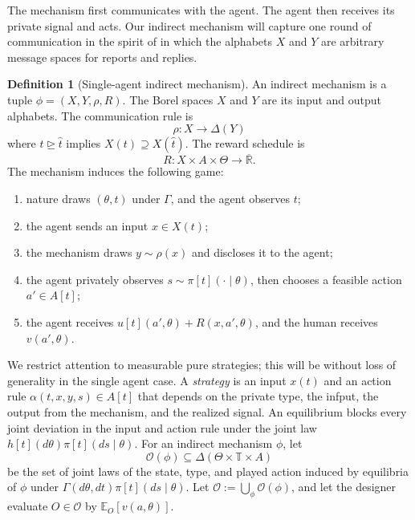 \documentclass[12pt,reqno]{article}
\newcommand{\Ex}{\mathbb{E}}
\newcommand{\Rbar}{\overline{\mathbb{R}}}
\theoremstyle{definition} \newtheorem{example}{Example}
\theoremstyle{definition} \newtheorem{condition}{Condition}
\theoremstyle{definition} \newtheorem{corollary}{Corollary}
\theoremstyle{definition} \newtheorem{claim}{Claim}
\theoremstyle{definition} \newtheorem{definition}{Definition}
\theoremstyle{definition} \newtheorem{conjecture}{Conjecture}
\theoremstyle{definition} \newtheorem{Lemma}{Lemma}
\theoremstyle{definition} \newtheorem{lemma}{Lemma}
\theoremstyle{plain} \newtheorem{theorem}{Theorem}
\theoremstyle{definition} \newtheorem{assumption}{Assumption}
\theoremstyle{definition} \newtheorem*{assumptionnonumber}{Assumption}
\theoremstyle{definition} \newtheorem*{theoremNoNumber}{Proposition}
\theoremstyle{definition}\newtheorem{proposition}{Proposition}
\theoremstyle{definition} \newtheorem{observation}{Observation}
\theoremstyle{definition} \newtheorem*{definitionNoNumber}{Definition}
\theoremstyle{definition} \newtheorem{Definition}{Definition}
\theoremstyle{definition} \newtheorem*{DefinitionNoNumber}{Definition}
\theoremstyle{definition} \newtheorem*{fact}{Fact}
\theoremstyle{definition} \newtheorem*{property}{Property}
\theoremstyle{definition} \newtheorem{remark}{Remark}
\theoremstyle{definition}\newtheorem{romanexampleinner}{Example}
\begin{document}
The mechanism first communicates with the agent. The agent then receives its private signal and acts. Our indirect mechanism will capture one round of communication in the spirit of \cite{myerson1982optimal,forges1986approach} in which the alphabets \(X\) and \(Y\) are arbitrary message spaces for reports and replies. 

\begin{definition}[Single-agent indirect mechanism]\label{def:mechanism-single}
An indirect mechanism is a tuple \(\phi=(X,Y,\rho,R)\). The Borel spaces \(X\) and \(Y\) are its input and output alphabets. The communication rule is 
\[
\rho:X\to\Delta(Y)
\]
where $t \trianglerighteq \hat t$ implies $X(t) \supseteq X(\hat t)$. The reward schedule is 
\[
R:X\times A\times\Theta\to\Rbar.
\]
The mechanism induces the following game:
\begin{enumerate}
    \item nature draws \((\theta,t)\) under \(\Gamma\), and the agent observes \(t\);
    \item the agent sends an input \(x\in {X(t)}\);
    \item the mechanism draws \(y\sim\rho(x)\) and discloses it to the agent;
    \item the agent privately observes \(s\sim\pi[t](\cdot\mid\theta)\), then chooses a feasible action \(a'\in A[t]\);
    \item the agent receives \(u[t](a',\theta)+R(x,a',\theta)\), and the human receives \(v(a',\theta)\).\footnotemark
\end{enumerate}
\end{definition}


We restrict attention to measurable pure strategies; this will be without loss of generality in the single agent case. A \emph{strategy} is an input \(x(t)\) and an action rule \(\alpha(t,x,y,s)\in A[t]\) that depends on the private type, the infput, the output from the mechanism, and the realized signal. An equilibrium blocks every joint deviation in the input and action rule under the joint law \(h[t](d\theta)\pi[t](ds\mid\theta)\). For an indirect mechanism \(\phi\), let
\[
\mathcal O(\phi)
\subseteq
\Delta(\Theta\times\mathbb T\times A)
\]
be the set of joint laws of the state, type, and played action induced by equilibria of \(\phi\) under \(\Gamma(d\theta,dt)\pi[t](ds\mid\theta)\). Let \(\mathcal O:=\bigcup_\phi\mathcal O(\phi)\), and let the designer evaluate \(O\in\mathcal O\) by \(\Ex_O[v(a,\theta)]\).
\end{document}

